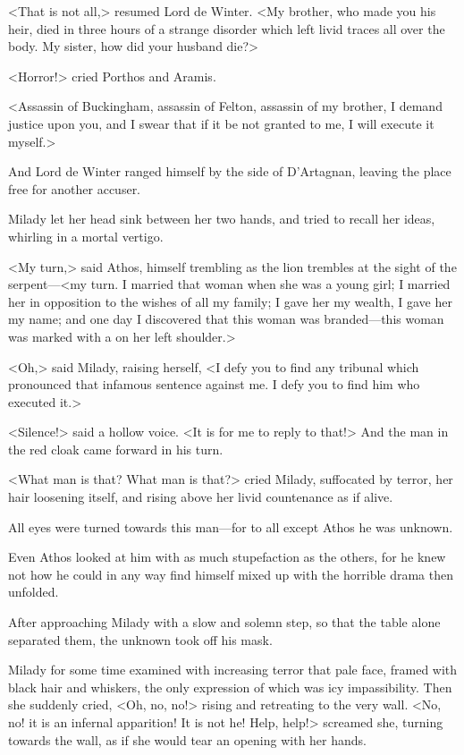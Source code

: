 <That is not all,> resumed Lord de Winter. <My brother, who made you his heir, died in three hours of a strange disorder which left livid traces all over the body. My sister, how did your husband die?> 

<Horror!> cried Porthos and Aramis. 

<Assassin of Buckingham, assassin of Felton, assassin of my brother, I demand justice upon you, and I swear that if it be not granted to me, I will execute it myself.> 

And Lord de Winter ranged himself by the side of D'Artagnan, leaving the place free for another accuser. 

Milady let her head sink between her two hands, and tried to recall her ideas, whirling in a mortal vertigo. 

<My turn,> said Athos, himself trembling as the lion trembles at the sight of the serpent—<my turn. I married that woman when she was a young girl; I married her in opposition to the wishes of all my family; I gave her my wealth, I gave her my name; and one day I discovered that this woman was branded—this woman was marked with a  on her left shoulder.> 

<Oh,> said Milady, raising herself, <I defy you to find any tribunal which pronounced that infamous sentence against me. I defy you to find him who executed it.> 

<Silence!> said a hollow voice. <It is for me to reply to that!> And the man in the red cloak came forward in his turn. 

<What man is that? What man is that?> cried Milady, suffocated by terror, her hair loosening itself, and rising above her livid countenance as if alive. 

All eyes were turned towards this man—for to all except Athos he was unknown. 

Even Athos looked at him with as much stupefaction as the others, for he knew not how he could in any way find himself mixed up with the horrible drama then unfolded. 

After approaching Milady with a slow and solemn step, so that the table alone separated them, the unknown took off his mask. 

Milady for some time examined with increasing terror that pale face, framed with black hair and whiskers, the only expression of which was icy impassibility. Then she suddenly cried, <Oh, no, no!> rising and retreating to the very wall. <No, no! it is an infernal apparition! It is not he! Help, help!> screamed she, turning towards the wall, as if she would tear an opening with her hands. 

